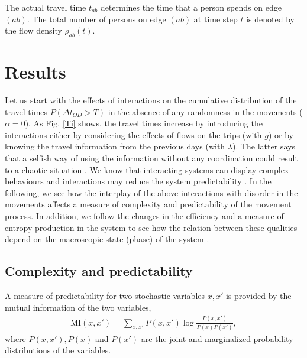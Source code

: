 \documentclass[aps,preprint]{revtex4-1}
\begin{document}
The actual travel time $t_{ab}$ determines the time that a person spends on edge $(ab)$. The total number of persons on edge $(ab)$ at time step $t$ is denoted by the flow density $\rho_{ab}(t)$. 


\section{Results}\label{S2}
Let us start with the effects of interactions on the cumulative distribution of the travel times $P(\Delta t_{OD}>T)$ in the absence of any randomness in the movements ($\alpha=0$). As Fig. \ref{Ti} shows, the travel times increase by introducing the interactions either by considering the effects of flows on the trips (with $g$) or by knowing the travel information from the previous days (with $\lambda$). The latter says that a selfish way of using the information without any coordination could result to a chaotic situation \cite{Apps-ieee-2019}. We know that interacting systems can display complex behaviours and interactions may reduce the system predictability \cite{watts-sci-2006}. In the following, we see how the interplay of the above interactions with disorder in the movements affects a measure of complexity and predictability of the movement process. In addition, we follow the changes in the efficiency and a measure of entropy production in the system to see how the relation between these qualities depend on the macroscopic state (phase) of the system \cite{efc-srep-2020}.  
                    

\subsection{Complexity and predictability}\label{S21}
A measure of predictability for two stochastic variables $x,x'$ is provided by the mutual information of the two variables,
\begin{align}
\mathrm{MI}(x,x')=\sum_{x,x'}P(x,x')\log\frac{P(x,x')}{P(x)P(x')},
\end{align}
where $P(x,x'), P(x)$ and $P(x')$ are the joint and marginalized probability distributions of the variables.
\end{document}
